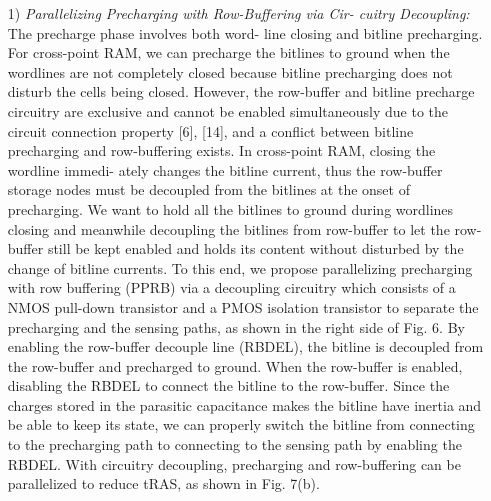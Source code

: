 \documentclass{article}
\begin{document}
 		\begin{enumerate}
 			\item[1)] \textit{Parallelizing Precharging with Row-Buffering via Cir-
 				cuitry Decoupling:} The precharge phase involves both word-
 			line closing and bitline precharging. For cross-point RAM, we
 			can precharge the bitlines to ground when the wordlines are
 			not completely closed because bitline precharging does not
 			disturb the cells being closed. However, the row-buffer and
 			bitline precharge circuitry are exclusive and cannot be enabled
 			simultaneously due to the circuit connection property [6], [14],
 			and a conflict between bitline precharging and row-buffering
 			exists. In cross-point RAM, closing the wordline immedi-
 			ately changes the bitline current, thus the row-buffer storage
 			nodes must be decoupled from the bitlines at the onset of
 			precharging. We want to hold all the bitlines to ground during
 			wordlines closing and meanwhile decoupling the bitlines from
 			row-buffer to let the row-buffer still be kept enabled and holds
 			its content without disturbed by the change of bitline currents.
 			To this end, we propose parallelizing precharging with row
 			buffering (PPRB) via a decoupling circuitry which consists of
 			a NMOS pull-down transistor and a PMOS isolation transistor
 			to separate the precharging and the sensing paths, as shown in
 			the right side of Fig. 6. By enabling the row-buffer decouple
 			line (RBDEL), the bitline is decoupled from the row-buffer
 			and precharged to ground. When the row-buffer is enabled,
 			disabling the RBDEL to connect the bitline to the row-buffer.
 			Since the charges stored in the parasitic capacitance makes
 			the bitline have inertia and be able to keep its state, we can
 			properly switch the bitline from connecting to the precharging
 			path to connecting to the sensing path by enabling the RBDEL.
 			With circuitry decoupling, precharging and row-buffering can
 			be parallelized to reduce tRAS, as shown in Fig. 7(b).
 			

\end{enumerate}
\end{document}
